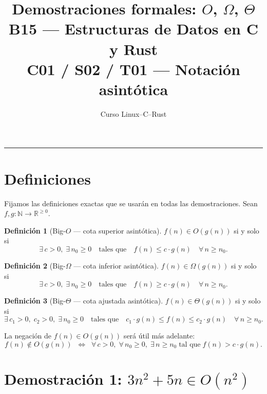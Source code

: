 \documentclass[11pt, letterpaper]{article}
\title{%
  \textbf{Demostraciones formales: $O$, $\Omega$, $\Theta$} \\[6pt]
  \large B15 --- Estructuras de Datos en C y Rust \\
  C01 / S02 / T01 --- Notación asintótica
}
\author{Curso Linux--C--Rust}
\date{}
\theoremstyle{definition}
\newtheorem{definition}{Definición}[section]
\theoremstyle{plain}
\theoremstyle{remark}
\begin{document}
\maketitle
\tableofcontents
\bigskip\hrule\bigskip

\section{Definiciones}

Fijamos las definiciones exactas que se usarán en todas las demostraciones.
Sean $f, g : \mathbb{N} \to \mathbb{R}^{\geq 0}$.

\begin{definition}[Big-$O$ --- cota superior asintótica]
  $f(n) \in O(g(n))$ si y solo si
  \[
    \exists\, c > 0,\; \exists\, n_0 \geq 0
    \quad\text{tales que}\quad
    f(n) \le c \cdot g(n)
    \quad \forall\, n \ge n_0.
  \]
\end{definition}

\begin{definition}[Big-$\Omega$ --- cota inferior asintótica]
  $f(n) \in \Omega(g(n))$ si y solo si
  \[
    \exists\, c > 0,\; \exists\, n_0 \geq 0
    \quad\text{tales que}\quad
    f(n) \ge c \cdot g(n)
    \quad \forall\, n \ge n_0.
  \]
\end{definition}

\begin{definition}[Big-$\Theta$ --- cota ajustada asintótica]
  $f(n) \in \Theta(g(n))$ si y solo si
  \[
    \exists\, c_1 > 0,\; c_2 > 0,\; \exists\, n_0 \geq 0
    \quad\text{tales que}\quad
    c_1 \cdot g(n) \le f(n) \le c_2 \cdot g(n)
    \quad \forall\, n \ge n_0.
  \]
\end{definition}

La negación de $f(n) \in O(g(n))$ será útil más adelante:
\[
  f(n) \notin O(g(n))
  \;\;\Longleftrightarrow\;\;
  \forall\, c > 0,\;
  \forall\, n_0 \geq 0,\;
  \exists\, n \geq n_0
  \;\text{tal que}\;
  f(n) > c \cdot g(n).
\]


\section{Demostración 1: \texorpdfstring{$3n^2 + 5n \in O(n^2)$}{3n²+5n ∈ O(n²)}}
\end{document}

